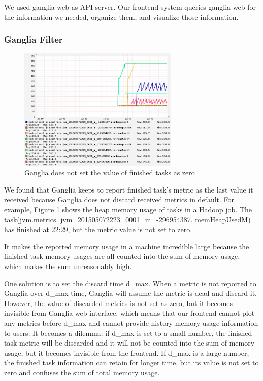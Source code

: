 We used ganglia-web as API server. Our frontend system queries ganglia-web for the information we needed, organize them, and visualize those information. 

\subsubsection{Ganglia Filter}

\begin{figure}[ht]
  \centering
    \includegraphics[width=3.0in]{image/ganglia_finished_tasks.png}
    \caption{Ganglia does not set the value of finished tasks as zero}
    \label{ref:gangliah_bug}
\end{figure}

We found that Ganglia keeps to report finished task's metric as the last value it received because Ganglia does not discard received metrics in default. For example, Figure \ref{ref:gangliah_bug} shows the heap memory usage of tasks in a Hadoop job. The task(jvm.metrics. jvm\_201505072223\_0001\_m\_-296954387. memHeapUsedM) has finished at 22:29, but the metric value is not set to zero.

It makes the reported memory usage in a machine incredible large because the finished task memory usages are all counted into the sum of memory usage, which makes the sum unreasonably high. 

One solution is to set the discard time d\_max. When a metric is not reported to Ganglia over d\_max time, Ganglia will assume the metric is dead and discard it. However, the value of discarded metrics is not set as zero, but it becomes invisible from Ganglia web-interface, which means that our frontend cannot plot any metrics before d\_max and cannot provide history memory usage information to users. It becomes a dilemma: if d\_max is set to a small number, the finished task metric will be discarded and it will not be counted into the sum of memory usage, but it becomes invisible from the frontend. If d\_max is a large number, the finished task information can retain for longer time, but its value is not set to zero and confuses the sum of total memory usage.

